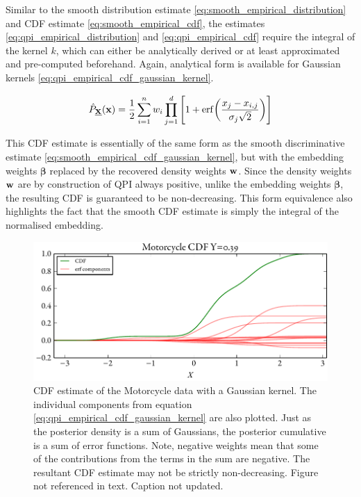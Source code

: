 \documentclass[twoside]{article} \usepackage{aistats2017}
\theoremstyle{definition}
\theoremstyle{remark}
\newcommand{\rv}[1]{\underline{#1}}
\newcommand{\warn}[1]{{\color{RedOrange} #1}}
\newcommand{\qpi}{QPI }
\begin{document}
	Similar to the smooth distribution estimate \eqref{eq:smooth_empirical_distribution} and CDF estimate \eqref{eq:smooth_empirical_cdf}, the estimates \eqref{eq:qpi_empirical_distribution} and \eqref{eq:qpi_empirical_cdf} require the integral of the kernel $k$, which can either be analytically derived or at least approximated and pre-computed beforehand. Again, analytical form is available for Gaussian kernels \eqref{eq:qpi_empirical_cdf_gaussian_kernel}.
	
	\begin{equation}
		\hat{P}_{\bvec{\rv{X}}}(\bvec{x}) = \frac{1}{2} \sum_{i = 1}^{n} w_{i} \prod_{j = 1}^{d} \Bigg[1 + \mathrm{erf}\bigg(\frac{x_{j} - x_{i, j}}{\sigma_{j} \sqrt{2}}\bigg)\Bigg]
	\label{eq:qpi_empirical_cdf_gaussian_kernel}
	\end{equation}
	
	This CDF estimate is essentially of the same form as the smooth discriminative estimate \eqref{eq:smooth_empirical_cdf_gaussian_kernel}, but with the embedding weights $\bm{\beta}$ replaced by the recovered density weights $\mathbf{w}$. Since the density weights $\mathbf{w}$ are by construction of \qpi always positive, unlike the embedding weights $\bm{\beta}$, the resulting CDF is guaranteed to be non-decreasing. This form equivalence also highlights the fact that the smooth CDF estimate is simply the integral of the normalised embedding.
	
		\begin{figure}
			\begin{center}
				\includegraphics[width=\columnwidth]{figures/cumulativeexampleerf}
			\end{center}
			\caption{\small CDF estimate of the Motorcycle data with a Gaussian kernel. The individual components from equation \eqref{eq:qpi_empirical_cdf_gaussian_kernel} are also plotted. Just as the posterior density is a sum of Gaussians, the posterior cumulative is a sum of error functions. Note, negative weights mean that some of the contributions from the terms in the sum are negative. The resultant CDF estimate may not be strictly non-decreasing. \warn{Figure not referenced in text. Caption not updated.}}
			\label{fig:cumulativeexampleerf} 
		\end{figure}
		
\end{document}
